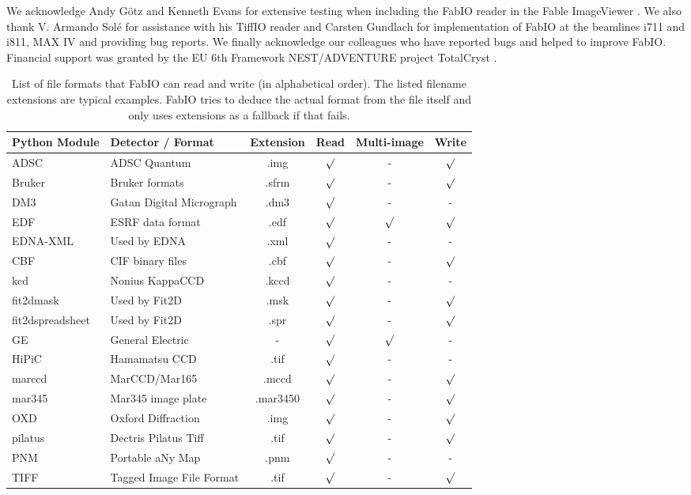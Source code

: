 \documentclass[preprint]{iucr}
\begin{document}

We acknowledge Andy G\"otz and Kenneth Evans for extensive testing when including
the FabIO reader in the Fable ImageViewer \cite{fable}.
We also thank V. Armando Sol\'e for assistance with his TiffIO reader and
Carsten Gundlach for implementation of FabIO at the beamlines i711 and i811, 
MAX IV and providing bug reports.
We finally acknowledge our colleagues who have reported bugs and helped to
improve FabIO.
Financial support was granted by the EU 6th Framework NEST/ADVENTURE project
TotalCryst \cite{totalcryst}.






\begin{table}
\caption{List of file formats that FabIO can read and write (in
alphabetical order). The listed filename extensions are typical examples.
FabIO tries to deduce the actual format from the file itself and only
uses extensions as a fallback if that fails.}
\label{format}
\vspace{1mm}
\begin{center}
\begin{tabular}{llcccc}
Python Module   & Detector / Format		& Extension & Read & Multi-image	& Write\\
\hline 
ADSC		&   ADSC Quantum				&	.img	&	$\surd$&	-	&	$\surd$		\\
Bruker		&   Bruker formats				&	.sfrm	&	$\surd$&	-	&	$\surd$		\\
DM3			&	Gatan Digital Micrograph	&	.dm3	&	$\surd$&	-	&	-	\\
EDF		    &   ESRF data format			&	.edf	&	$\surd$&	$\surd$		&	$\surd$		\\
EDNA-XML	& 	Used by EDNA \cite{edna} 	&	.xml	&	$\surd$&	-	&	-	 \\
CBF		    &   CIF binary files			&	.cbf	&	$\surd$&	- 	& 	$\surd$		\\
kcd	    	&   Nonius 	KappaCCD			&	.kccd	&	$\surd$&	- 	&	-		\\
fit2dmask  	&	Used by Fit2D \cite{fit2d}	&   .msk    &	$\surd$&   -  &   $\surd$  \\
fit2dspreadsheet & Used by Fit2D \cite{fit2d}	&  .spr    &	$\surd$&   -  & $\surd$    \\
GE		    &   General Electric	&	-		&	$\surd$&	$\surd$	&	-		\\
HiPiC       & 	Hamamatsu CCD 		&	.tif	&	$\surd$&	-	&	-	 	\\
marccd		&   MarCCD/Mar165		&	.mccd	&	$\surd$&	-	&	$\surd$		\\
mar345		&   Mar345 image plate	&	.mar3450		&	$\surd$&	-	&	$\surd$		\\
OXD		    &   Oxford Diffraction 	&	.img	&	$\surd$&	-	&	$\surd$		\\
pilatus	    & Dectris Pilatus Tiff	&	.tif	&	$\surd$&	-	&	$\surd$		\\
PNM			&	Portable aNy Map	& .pnm	&	$\surd$&	-	&	-		\\
TIFF		&	Tagged Image File Format	&	.tif	&	$\surd$&	-	&	$\surd$		\\
\end{tabular}
\end{center}
\end{table}
\end{document}
